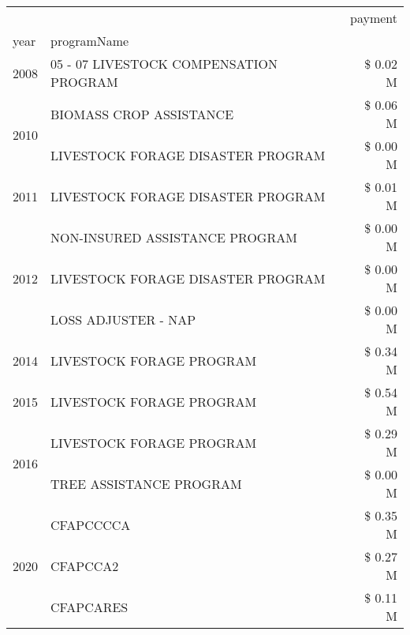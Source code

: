 \begin{tabular}{llr}
\toprule
 &  & payment \\
year & programName &  \\
\midrule
2008 & 05 - 07 LIVESTOCK COMPENSATION PROGRAM & \$ 0.02 M \\
\cline{1-3}
\multirow[t]{2}{*}{2010} & BIOMASS CROP ASSISTANCE & \$ 0.06 M \\
 & LIVESTOCK FORAGE DISASTER  PROGRAM & \$ 0.00 M \\
\cline{1-3}
2011 & LIVESTOCK FORAGE DISASTER PROGRAM & \$ 0.01 M \\
\cline{1-3}
\multirow[t]{3}{*}{2012} & NON-INSURED ASSISTANCE PROGRAM & \$ 0.00 M \\
 & LIVESTOCK FORAGE DISASTER PROGRAM & \$ 0.00 M \\
 & LOSS ADJUSTER - NAP & \$ 0.00 M \\
\cline{1-3}
2014 & LIVESTOCK FORAGE PROGRAM & \$ 0.34 M \\
\cline{1-3}
2015 & LIVESTOCK FORAGE PROGRAM & \$ 0.54 M \\
\cline{1-3}
\multirow[t]{2}{*}{2016} & LIVESTOCK FORAGE PROGRAM & \$ 0.29 M \\
 & TREE ASSISTANCE PROGRAM & \$ 0.00 M \\
\cline{1-3}
\multirow[t]{3}{*}{2020} & CFAPCCCCA & \$ 0.35 M \\
 & CFAPCCA2 & \$ 0.27 M \\
 & CFAPCARES & \$ 0.11 M \\
\cline{1-3}
\bottomrule
\end{tabular}
